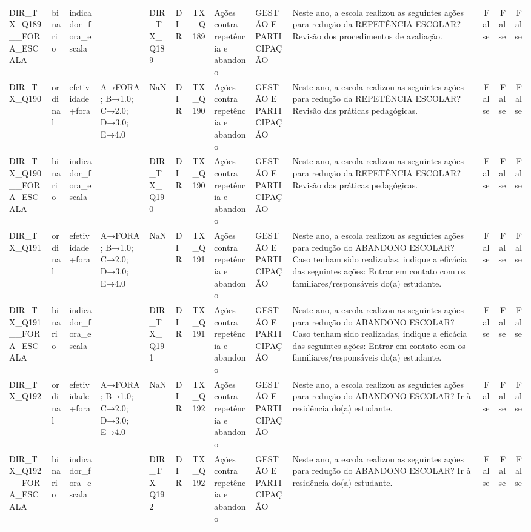 \begin{tabular}{llllllllllrrr}
DIR\_TX\_Q189\_\_FORA\_ESCALA & binario & indicador\_fora\_escala &  & DIR\_TX\_Q189 & DIR & TX\_Q189 & Ações contra repetência e abandono & GESTÃO E PARTICIPAÇÃO & Neste ano, a escola realizou as seguintes ações para redução da REPETÊNCIA ESCOLAR? Revisão dos procedimentos de avaliação. & False & False & False \\
DIR\_TX\_Q190 & ordinal & efetividade+fora & A→FORA; B→1.0; C→2.0; D→3.0; E→4.0 & NaN & DIR & TX\_Q190 & Ações contra repetência e abandono & GESTÃO E PARTICIPAÇÃO & Neste ano, a escola realizou as seguintes ações para redução da REPETÊNCIA ESCOLAR? Revisão das práticas pedagógicas. & False & False & False \\
DIR\_TX\_Q190\_\_FORA\_ESCALA & binario & indicador\_fora\_escala &  & DIR\_TX\_Q190 & DIR & TX\_Q190 & Ações contra repetência e abandono & GESTÃO E PARTICIPAÇÃO & Neste ano, a escola realizou as seguintes ações para redução da REPETÊNCIA ESCOLAR? Revisão das práticas pedagógicas. & False & False & False \\
DIR\_TX\_Q191 & ordinal & efetividade+fora & A→FORA; B→1.0; C→2.0; D→3.0; E→4.0 & NaN & DIR & TX\_Q191 & Ações contra repetência e abandono & GESTÃO E PARTICIPAÇÃO & Neste ano, a escola realizou as seguintes ações para redução do ABANDONO ESCOLAR? Caso tenham sido realizadas, indique a eficácia das seguintes ações: Entrar em contato com os familiares/responsáveis do(a) estudante. & False & False & False \\
DIR\_TX\_Q191\_\_FORA\_ESCALA & binario & indicador\_fora\_escala &  & DIR\_TX\_Q191 & DIR & TX\_Q191 & Ações contra repetência e abandono & GESTÃO E PARTICIPAÇÃO & Neste ano, a escola realizou as seguintes ações para redução do ABANDONO ESCOLAR? Caso tenham sido realizadas, indique a eficácia das seguintes ações: Entrar em contato com os familiares/responsáveis do(a) estudante. & False & False & False \\
DIR\_TX\_Q192 & ordinal & efetividade+fora & A→FORA; B→1.0; C→2.0; D→3.0; E→4.0 & NaN & DIR & TX\_Q192 & Ações contra repetência e abandono & GESTÃO E PARTICIPAÇÃO & Neste ano, a escola realizou as seguintes ações para redução do ABANDONO ESCOLAR? Ir à residência do(a) estudante. & False & False & False \\
DIR\_TX\_Q192\_\_FORA\_ESCALA & binario & indicador\_fora\_escala &  & DIR\_TX\_Q192 & DIR & TX\_Q192 & Ações contra repetência e abandono & GESTÃO E PARTICIPAÇÃO & Neste ano, a escola realizou as seguintes ações para redução do ABANDONO ESCOLAR? Ir à residência do(a) estudante. & False & False & False \\

\end{tabular}
